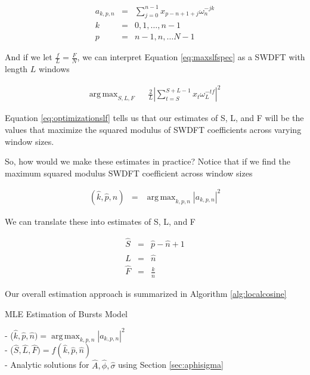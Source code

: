\documentclass[11pt]{article}
\theoremstyle{plain}
\theoremstyle{definition}
\DeclareMathOperator*{\argmax}{arg\,max}
\begin{document}
\begin{eqnarray}
\label{eq:swdft}
	a_{k, p, n} &=& \sum_{j=0}^{n-1} x_{p-n+1+j} \omega_n^{-jk} \nonumber \\
	k &=& 0, 1, \ldots, n - 1 \nonumber \\
	p &=& n - 1, n, \ldots N - 1 
\end{eqnarray}

\noindent And if we let $\frac{f}{L} = \frac{F}{N}$, we can interpret Equation \ref{eq:maxslfspec} as a SWDFT with length $L$ windows

\begin{eqnarray}
\label{eq:optimizationslf}
	\argmax_{S, L, F} && \frac{2}{L} |\sum_{t=S}^{S+L-1} x_t \omega_L^{-tf}|^2 
\end{eqnarray}

\noindent Equation \ref{eq:optimizationslf} tells us that our estimates of S, L, and F will be the values that maximize the squared modulus of SWDFT coefficients across varying window sizes. 

So, how would we make these estimates in practice? Notice that if we find the maximum squared modulus SWDFT coefficient across window sizes

\begin{eqnarray}
\label{eq:maxswdftwindow}
	(\hat{k}, \hat{p}, \hat{n}) &=&\argmax_{k,p,n} |a_{k, p, n}|^2
\end{eqnarray}

\noindent We can translate these into estimates of S, L, and F

\begin{eqnarray}
	\hat{S} &=& \hat{p} - \hat{n} + 1 \nonumber \\
	\hat{L} &=& \hat{n} \nonumber \\
	\hat{F} &=& \frac{\hat{k}}{\hat{n}}
\end{eqnarray}

\noindent Our overall estimation approach is summarized in Algorithm \ref{alg:localcosine}

\begin{algorithm}
\caption{MLE Estimation of Bursts Model} 
\SetAlgoLined
- ($\hat{k}, \hat{p}, \hat{n}) = \argmax_{k, p, n} |a_{k, p, n}|^2$ \\
- ($\hat{S}, \hat{L}, \hat{F}) = f(\hat{k}, \hat{p}, \hat{n})$ \\
- Analytic solutions for $\hat{A}, \hat{\phi}, \hat{\sigma}$ using Section \ref{sec:aphisigma} \\
\label{alg::localcosine}
\end{algorithm}
\end{document}
